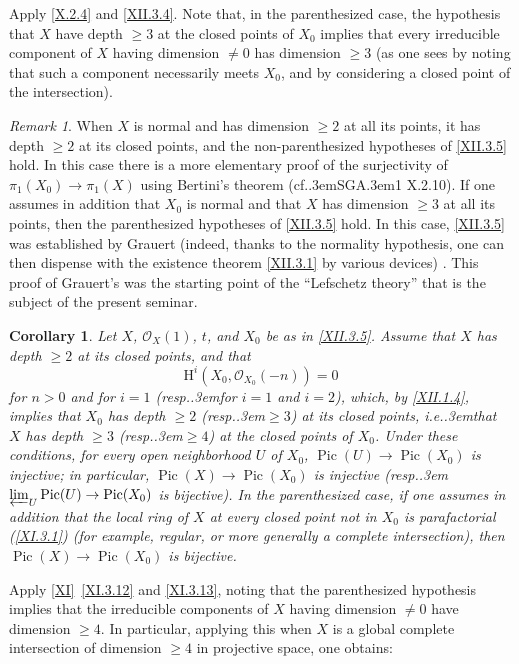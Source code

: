 \documentclass[11pt,a4paper,oneside]{book}
\providecommand{\pageoriginale}{%
  \refstepcounter{pageoriginal}%
  \marginpar{\raggedright\footnotesize\bfseries\thepageoriginal}%
  \xspace}
\providecommand{\og}{``}
\providecommand{\fg}{''\xspace}
\providecommand{\cf}{cf.\kern.3em}
\providecommand{\ie}{i.e.\kern.3em}
\providecommand{\resp}{resp.\kern.3em}
\providecommand{\SGA}{\textup{SGA}\kern.3em}
\providecommand{\Oo}{\mathcal O}
\providecommand{\OX}{\mathcal O_X}
\providecommand{\Pic}{\operatorname{Pic}}
\renewcommand{\H}{\mathrm H}
\theoremstyle{plain}
\newtheorem{corollaire}[subsection]{Corollary}
\theoremstyle{definition}
\theoremstyle{remark}
\newtheorem*{remarquestar}{Remark}
\renewcommand{\Ref}[1]{\textup{\ref{#1}}}
\begin{document}
Apply \Ref{X.2.4} and \Ref{XII.3.4}. Note that, in the parenthesized case, the hypothesis that $X$ have depth $\geq 3$ at the closed points of $X_0$ implies that every irreducible component of $X$ having dimension $\neq 0$ has dimension $\geq 3$ (as one sees by noting that such a component necessarily meets $X_0$, and by considering a closed point of the intersection).

\begin{remarquestar}
When $X$ is normal and has dimension $\geq 2$ at all its points, it has depth $\geq 2$ at its closed points, and the non-parenthesized hypotheses of \Ref{XII.3.5} hold. In this case there is a more elementary proof of the surjectivity of $\pi_1(X_0)\to \pi_1(X)$ using Bertini's theorem (\cf \SGA 1 X.2.10). If one assumes in addition that $X_0$ is normal and that $X$ has dimension $\geq 3$ at all its points, then the parenthesized hypotheses of \Ref{XII.3.5} hold. In this case, \Ref{XII.3.5} was established by Grauert (indeed, thanks to the normality hypothesis, one can then dispense with the existence theorem \Ref{XII.3.1} by various devices)\pageoriginale. This proof of Grauert's was the starting point of the \og Lefschetz theory\fg that is the subject of the present seminar.
\end{remarquestar}

\begin{corollaire} \label{XII.3.6} Let $X$, $\OX(1)$, $t$, and $X_0$ be as in \Ref{XII.3.5}. Assume that $X$ has depth $\geq 2$ at its closed points, and that
\[
\H^i(X_0, \Oo_{X_0}(-n))=0
\]
for $n>0$ and for $i=1$ (\resp for $i=1$ and $i=2$), which, by \Ref{XII.1.4}, implies that $X_0$ has depth $\geq 2$ (\resp $\geq 3$) at its closed points, \ie that $X$ has depth $\geq 3$ (\resp $\geq 4$) at the closed points of $X_0$. Under these conditions, for every open neighborhood $U$ of $X_0$, $\Pic(U)\to\Pic(X_0)$ is injective; in particular, $\Pic(X)\to\Pic(X_0)$ is injective (\resp $\varprojlim_U \Pic(U)\to\Pic(X_0)$ is bijective). In the parenthesized case, if one assumes in addition that the local ring of $X$ at every closed point not in $X_0$ is parafactorial (\Ref{XI.3.1}) (for example, regular, or more generally a complete intersection), then $\Pic(X)\to\Pic(X_0)$ is bijective.
\end{corollaire}
Apply \Ref{XI}~\Ref{XI.3.12} and \Ref{XI.3.13}, noting that the parenthesized hypothesis implies that the irreducible components of $X$ having dimension $\neq 0$ have dimension $\geq 4$. In particular, applying this when $X$ is a global complete intersection of dimension $\geq 4$ in projective space, one obtains:
\end{document}
